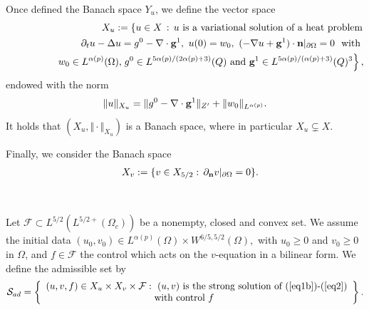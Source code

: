 \documentclass[11pt,reqno]{amsart}%
\numberwithin{equation}{section}
\begin{document}
% 
 Once defined the  Banach space $Y_u$, we define the vector space
\begin{eqnarray}
&&X_u:=\left\{u\in X\,:\, \hbox{$u$ is a variational solution of a heat problem}  \right.
\nonumber\\
&&\hspace{1.5cm}\partial_tu-\Delta u=g^0-\nabla\cdot{\bf g}^1,\ u(0)=w_0,\ (-\nabla u + {\bf g}^1)\cdot {\bf n}\vert_{\partial \Omega}=0\ \mbox{ with }\nonumber \\
&&\hspace{1.5cm}
w_0\in L^{\alpha(p)}(\Omega), \left.g^0\in L^{5\alpha(p)/(2\alpha(p)+3)}(Q)\mbox{ and } {\bf g}^1\in L^{5\alpha(p)/(\alpha(p)+3)}(Q)^3\right\}, \label{xu}
\end{eqnarray}
endowed with the norm 
$$\Vert u\Vert_{X_u}=\Vert g^0-\nabla\cdot {\bf g}^1\Vert_{Z'}+\Vert w_0\Vert_{L^{\alpha(p)}}.
$$
 It holds that $(X_u,\Vert\cdot\Vert_{X_u})$ is a Banach space, where in particular $X_u \varsubsetneq X.$  
 
 Finally, we consider the Banach space
\begin{eqnarray}
&&X_v:=\{ v \in X_{5/2}: \, \partial_{\bf n} v \vert_{\partial \Omega}=0\}.\label{xv}
\end{eqnarray}


\



 Let  
$\mathcal{F}\subset L^{5/2}(L^{5/2+}(\Omega_c))$ be a nonempty, closed and convex set. 
 We assume the initial data $(u_0,v_0)\in L^{\alpha(p)}(\Omega)\times W^{6/5,5/2}(\Omega),
$ with $u_0\ge 0$ and $v_0\ge 0$ in $\Omega$, 
 and  $f\in\mathcal{F}$ the control which acts
on the  $v$-equation in a bilinear form. We define the admissible set  by 
\begin{equation}\label{s-ad}
\mathcal{S}_{ad}=\left\{
\begin{array}{lc}
(u,v,f)\in X_u\times X_v\times \mathcal{F}:\ (u,v)\  \mbox{is the strong solution of (\ref{eq1b})-(\ref{eq2})}\\
\ \ \ \ \ \ \ \ \ \ \ \ \ \ \ \ \ \ \ \ \ \ \ \ \ \ \ \ \ \ \ \ \ \ \mbox{with control}\ f
\end{array}
\right\}.
\end{equation}
\end{document}
